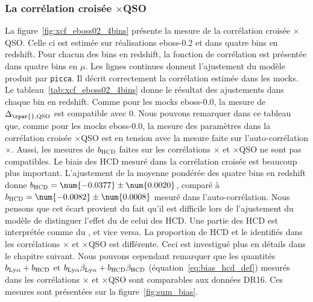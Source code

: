 \subsubsection{La corrélation croisée \lya{}$\times$QSO}
La figure~\ref{fig:xcf_eboss02_4bins} présente la mesure de la corrélation croisée \lya{}$\times$QSO. Celle ci est estimée sur \Nmocks{} réalisations eboss-0.2 et dans quatre bins en redshift. Pour chacun des bins en redshift, la fonction de corrélation est présentée dans quatre bins en $\mu$.
Les lignes continues donnent l'ajustement du modèle produit par \texttt{picca}. Il décrit correctement la corrélation estimée dans les mocks.
Le tableau~\ref{tab:xcf_eboss02_4bins} donne le résultat des ajustements dans chaque bin en redshift.
Comme pour les mocks eboss-0.0, la mesure de $\Delta_{\rpar{}, \textsc{QSO}}$ est compatible avec 0.
Nous pouvons remarquer dans ce tableau que, comme pour les mocks eboss-0.0, la mesure des paramètres \lya{} dans la corrélation croisée \lya{}$\times$QSO est en tension avec la mesure faite sur l'auto-corrélation \lya{}$\times$\lya{}.
  Aussi, les mesures de $b_{\textsc{HCD}}$ faites sur les corrélations \lya{}$\times$\lya{} et \lya{}$\times$QSO ne sont pas compatibles. Le biais des HCD mesuré dans la corrélation croisée est beaucoup plus important. L'ajustement de la moyenne pondérée des quatre bins en redshift donne $b_{\textsc{HCD}} = \num{-0.0377} \pm \num{0.0020}$, comparé à $b_{\textsc{HCD}} = \num{-0.0082} \pm \num{0.0008}$ mesuré dans l'auto-corrélation.
  Nous pensons que cet écart provient du fait qu'il est difficile lors de l'ajustement du modèle de distinguer l'effet du \lya{} de celui des HCD. Une partie des HCD est interprétée comme du \lya{}, et vice versa. La proportion de HCD et le \lya{} identifiés dans les corrélations \lya{}$\times$\lya{} et \lya{}$\times$QSO est différente. Ceci est investigué plus en détails dans le chapitre suivant.
  Nous pouvons cependant remarquer que les quantités $b_{\mathrm{Ly}\alpha} + b_{\textsc{HCD}}$ et $b_{\mathrm{Ly}\alpha}\beta_{\mathrm{Ly}\alpha} + b_{\textsc{HCD}}\beta_{\textsc{HCD}}$ (équation~\ref{eq:bias_hcd_def}) mesurés dans les corrélations \lya{}$\times$\lya{} et \lya{}$\times$QSO sont comparables aux données DR16. Ces mesures sont présentées sur la figure~\ref{fig:sum_bias}.



